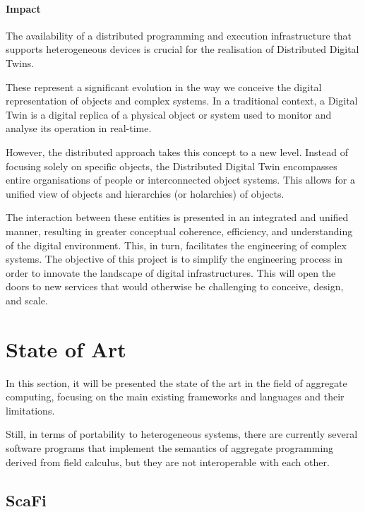 \paragraph{Impact}
The availability of a distributed programming and execution infrastructure that supports heterogeneous devices is crucial
for the realisation of Distributed Digital Twins.

These represent a significant evolution in the way we conceive the digital representation of objects and complex systems.
In a traditional context, a Digital Twin is a digital replica of a physical object or system used to monitor and analyse
its operation in real-time.

However, the distributed approach takes this concept to a new level.
Instead of focusing solely on specific objects, the Distributed Digital Twin encompasses entire organisations of people
or interconnected object systems.
This allows for a unified view of objects and hierarchies (or holarchies) of objects.

The interaction between these entities is presented in an integrated and unified manner, resulting in greater conceptual
coherence, efficiency, and understanding of the digital environment.
This, in turn, facilitates the engineering of complex systems.
The objective of this project is to simplify the engineering process in order to innovate the landscape of digital infrastructures.
This will open the doors to new services that would otherwise be challenging to conceive, design, and scale.

\section{State of Art}
\label{sec:state-of-art}

In this section, it will be presented the state of the art in the field of aggregate computing, focusing on the main existing
frameworks and languages and their limitations.

Still, in terms of portability to heterogeneous systems, there are currently several software programs that implement the
semantics of aggregate programming derived from field calculus, but they are not interoperable with each other.

\subsection{ScaFi}
\label{subsec:scafi}


